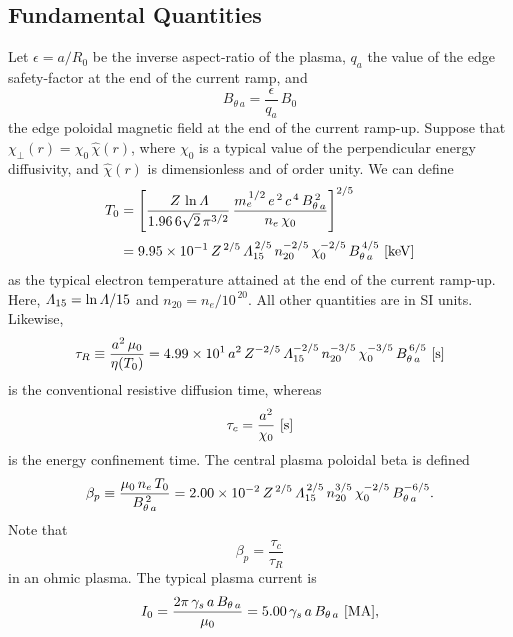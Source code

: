 \documentclass{iopjournal}
\begin{document}
 \subsection{Fundamental Quantities}
 Let $\epsilon= a/R_0$ be the inverse aspect-ratio of the plasma, $q_a$ the value of the edge safety-factor at the end of the current ramp, and 
 \begin{equation}
 B_{\theta\,a}= \frac{\epsilon}{q_a}\,B_0
 \end{equation}
 the edge poloidal magnetic field at the end of the  current ramp-up. Suppose that $\chi_\perp (r)= \chi_0\,\hat{\chi}(r)$, where $\chi_0$ is a
 typical value of the perpendicular energy diffusivity, and $\hat{\chi}(r)$ is dimensionless and of order unity. 
 We can define
 \begin{align}
 T_0&= \left[\frac{\,Z\,\ln{\mit\Lambda}}{1.96\,6\sqrt{2}\,\pi^{3/2}}\,\frac{m_e^{\,1/2}\,e^{\,2}\,c^{\,4}\,B_{\theta\,a}^{\,2}}{n_e\,\chi_0}\right]^{2/5}\\[0.5ex]
 &= 9.95\times 10^{-1}\,Z^{\,2/5}\,{\mit\Lambda}_{15}^{\,2/5}\,n_{20}^{-2/5}\,\chi_0^{-2/5}\,B_{\theta\,a}^{\,4/5}\,\,[{\rm keV}]
 \end{align}
 as the typical electron temperature attained at the end of the current ramp-up. Here, ${\mit\Lambda}_{15}=\ln{\mit\Lambda}/15$ and $n_{20}=n_e/10^{\,20}$. 
 All other quantities are in SI units. Likewise, 
 \begin{equation}\label{taur}
 \tau_R \equiv \frac{a^2\,\mu_0}{\eta(T_0)}= 4.99\times 10^1\,a^2\,Z^{-2/5}\,{\mit\Lambda}_{15}^{-2/5}\,n_{20}^{-3/5}\,\chi_0^{-3/5}\,B_{\theta\,a}^{\,6/5}\,\,[{\rm s}]
 \end{equation}
 is the conventional resistive diffusion time, whereas 
 \begin{equation}
 \tau_c= \frac{a^2}{\chi_0}\,\,[{\rm s}]
 \end{equation}
 is the energy confinement time. The central plasma poloidal beta is defined
 \begin{equation}\label{e16}
 \beta_p\equiv \frac{\mu_0\,n_e\,T_0}{B_{\theta\,a}^{\,2}} =  2.00\times 10^{-2}\,Z^{\,2/5}\,{\mit\Lambda}_{15}^{\,2/5}\,n_{20}^{3/5}\,\chi_0^{-2/5}\,B_{\theta\,a}^{-6/5}.
 \end{equation}
 Note that
 \begin{equation}\label{e17}
 \beta_p = \frac{\tau_c}{\tau_R}
 \end{equation}
 in an ohmic plasma. 
 The typical plasma current is
 \begin{equation}
 I_0= \frac{2\pi\,\gamma_s\,a\,B_{\theta\,a}}{\mu_0} = 5.00\,\gamma_s\,a\,B_{\theta\,a}\,\,[{\rm MA}],
 \end{equation}
\end{document}
